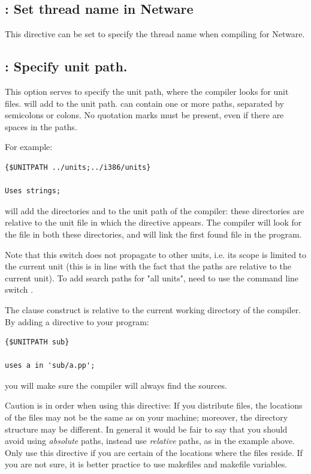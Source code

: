 \subsection{ : Set thread name in Netware}
This directive can be set to specify the thread name when compiling for
Netware. 

\subsection{ : Specify unit path.}

This option serves to specify the unit path, where the compiler looks for
unit files.  will add  to the unit
path.  can contain one or more paths, separated by semicolons or
colons. No quotation marks must be present, even if there are spaces in the paths.

For example:
\begin{verbatim}
{$UNITPATH ../units;../i386/units}

Uses strings;
\end{verbatim}

will add the directories  and  to the unit
path of the compiler: these directories are relative to the unit file in
which the directive appears. The compiler will look for the file 
in both these directories, and will link the first found file in the
program.

Note that this switch does not propagate to other units, i.e. its scope
is limited to the current unit (this is in line with the fact that the paths
are relative to the current unit). To add search paths for "all units",
need to use the command line switch .

The  clause construct  is relative to the 
current working directory of the compiler. By adding a directive to your
program:
\begin{verbatim}
{$UNITPATH sub}

uses a in 'sub/a.pp';
\end{verbatim}
you will make sure the compiler will always find the sources.

Caution is in order when using this directive: If you distribute files, the
locations of the files may not be the same as on your machine; moreover, the
directory structure may be different. In general it would be fair to say
that you should avoid using {\em absolute} paths, instead use {\em relative}
paths, as in the example above. Only use this directive if you are certain
of the locations where the files reside. If you are not sure, it is better
practice to use makefiles and makefile variables.

